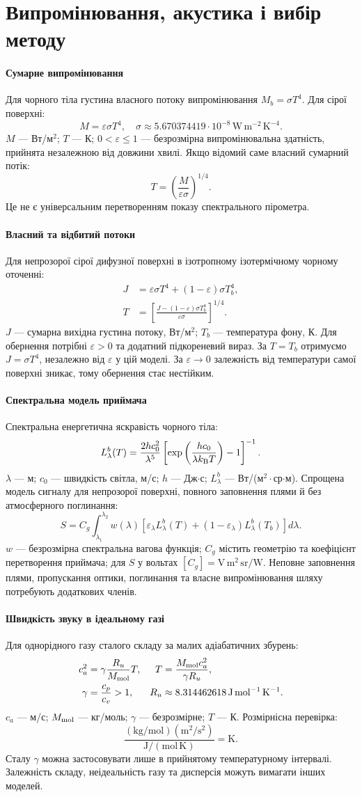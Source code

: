 \documentclass[11pt,a4paper]{article}
\newcommand{\K}{\mathrm{K}}
\newcommand{\unit}[1]{\,\mathrm{#1}}
\newcommand{\defn}[1]{\paragraph{#1}}
\begin{document}
\section{Випромінювання, акустика і вибір методу}

\defn{Сумарне випромінювання}
Для чорного тіла густина власного потоку випромінювання
$M_b=\sigma T^4$. Для сірої поверхні:
\begin{equation}
 M=\varepsilon\sigma T^4,
 \quad\sigma\approx5.670374419\cdot10^{-8}\unit{W\,m^{-2}\,K^{-4}}.
\end{equation}
$M$ --- Вт/м$^2$; $T$ --- К; $0<\varepsilon\le1$ --- безрозмірна випромінювальна здатність, прийнята незалежною від довжини хвилі.
Якщо відомий саме власний сумарний потік:
\[
 T=\left(\frac{M}{\varepsilon\sigma}\right)^{1/4}.
\]
Це не є універсальним перетворенням показу спектрального пірометра.

\defn{Власний та відбитий потоки}
Для непрозорої сірої дифузної поверхні в ізотропному ізотермічному чорному оточенні:
\begin{align}
 J&=\varepsilon\sigma T^4+(1-\varepsilon)\sigma T_b^4,\\
 T&=\left[\frac{J-(1-\varepsilon)\sigma T_b^4}{\varepsilon\sigma}\right]^{1/4}.
\end{align}
$J$ --- сумарна вихідна густина потоку, Вт/м$^2$; $T_b$ --- температура фону, К.
Для обернення потрібні $\varepsilon>0$ та додатний підкореневий вираз.
За $T=T_b$ отримуємо $J=\sigma T^4$, незалежно від $\varepsilon$ у цій моделі.
За $\varepsilon\to0$ залежність від температури самої поверхні зникає, тому обернення стає нестійким.

\defn{Спектральна модель приймача}
Спектральна енергетична яскравість чорного тіла:
\[
 L_\lambda^b(T)=\frac{2hc_0^2}{\lambda^5}
 \left[\exp\left(\frac{hc_0}{\lambda k_{\rm B}T}\right)-1\right]^{-1}.
\]
$\lambda$ --- м; $c_0$ --- швидкість світла, м/с; $h$ --- Дж$\cdot$с;
$L_\lambda^b$ --- Вт/(м$^2\cdot$ср$\cdot$м).
Спрощена модель сигналу для непрозорої поверхні, повного заповнення плями й без атмосферного поглинання:
\[
 S=C_g\int_{\lambda_1}^{\lambda_2}w(\lambda)
 \left[\varepsilon_\lambda L_\lambda^b(T)
 +(1-\varepsilon_\lambda)L_\lambda^b(T_b)\right]d\lambda.
\]
$w$ --- безрозмірна спектральна вагова функція;
$C_g$ містить геометрію та коефіцієнт перетворення приймача;
для $S$ у вольтах $[C_g]=\mathrm{V\,m^2\,sr/W}$.
Неповне заповнення плями, пропускання оптики, поглинання та власне випромінювання шляху потребують додаткових членів.

\defn{Швидкість звуку в ідеальному газі}
Для однорідного газу сталого складу за малих адіабатичних збурень:
\begin{align}
 c_a^2&=\gamma\frac{R_u}{M_{\rm mol}}T, &
 T&=\frac{M_{\rm mol}c_a^2}{\gamma R_u},\\
 \gamma&=\frac{c_p}{c_v}>1, &
 R_u&\approx8.314462618\unit{J\,mol^{-1}\,K^{-1}}.
\end{align}
$c_a$ --- м/с; $M_{\rm mol}$ --- кг/моль; $\gamma$ --- безрозмірне;
$T$ --- К. Розмірнісна перевірка:
\[
 \frac{(\mathrm{kg/mol})(\mathrm{m^2/s^2})}
 {\mathrm{J/(mol\,K)}}=\K.
\]
Сталу $\gamma$ можна застосовувати лише в прийнятому температурному інтервалі.
Залежність складу, неідеальність газу та дисперсія можуть вимагати інших моделей.
\end{document}
